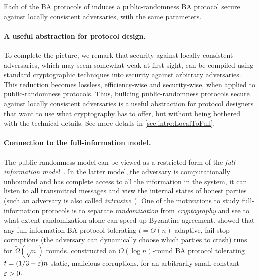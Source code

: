 \begin{proposition}\label{prop:mal_to_local}
Each of the BA protocols of \cite{FM97,FG03,KK06,Micali17,SM16,MV17,ADDNR19,ACDNPRS19} induces a public-randomness BA protocol secure against locally consistent adversaries, with the same parameters.
\end{proposition}


\paragraph{A useful abstraction for protocol design.}
To complete the picture, we remark that security against locally consistent adversaries, which may seem somewhat weak at first sight, can be compiled using standard cryptographic techniques into security against arbitrary adversaries. This reduction becomes lossless, efficiency-wise and security-wise, when applied to public-randomness protocols. Thus, building public-randomness protocols secure against locally consistent adversaries is a useful abstraction for protocol designers that want to use what cryptography has to offer, but without being bothered with the technical details.
See more details in \cref{sec:intro:LocalToFull}.

\paragraph{Connection to the full-information model.}
The public-randomness model can be viewed as a restricted form of the \emph{full-information model}~\cite{CC84,BL85,GGL98,BB98,BPV06,GPV06,KKKSS08,Lewko11,KS13,LL13}. In the latter model, the adversary is computationally unbounded and has complete access to all the information in the system, \ie it can listen to all transmitted messages and view the internal states of honest parties (such an adversary is also called \emph{intrusive}~\cite{CC84}). One of the motivations to study full-information protocols is to separate \emph{randomization} from \emph{cryptography} and see to what extent randomization alone can speed up Byzantine agreement. \citet{BB98} showed that any full-information BA protocol tolerating $t=\Theta(n)$ adaptive, fail-stop corruptions (\ie the adversary can dynamically choose which parties to crash) runs for $\tilde \Omega(\sqrt{n})$ rounds. \citet{GPV06} constructed an $O(\log{n})$-round BA protocol tolerating $t=(1/3-\varepsilon)n$ static, malicious corruptions, for an arbitrarily small constant $\varepsilon>0$.


